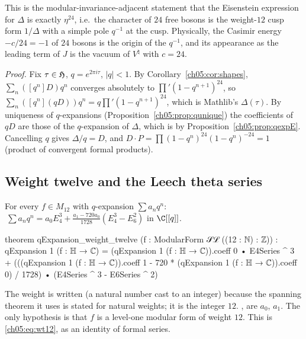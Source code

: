 \begin{physics}
This is the modular-invariance-adjacent statement that the Eisenstein expression for $\Delta$ is exactly $\eta^{24}$, i.e.\ the character of $24$ free bosons is the weight-$12$ cusp form $1/\Delta$ with a simple pole $q^{-1}$ at the cusp. Physically, the Casimir energy $-c/24=-1$ of $24$ bosons is the origin of the $q^{-1}$, and its appearance as the leading term of $J$ is the vacuum of $V^\natural$ with $c=24$.
\end{physics}
\noindent\emph{Proof.} Fix $\tau\in\mathfrak{H}$, $q = e^{2\pi i\tau}$, $|q|<1$. By
Corollary~\ref{ch05:cor:shapes}, $\sum_n([q^n]D)q^n$ converges absolutely to $\prod'(1-q^{n+1})^{24}$, so
$\sum_n([q^n](qD))q^n = q\prod'(1-q^{n+1})^{24}$, which is Mathlib's $\Delta(\tau)$. By uniqueness of
$q$-expansions (Proposition~\ref{ch05:prop:qunique}) the coefficients of $qD$ are those of the
$q$-expansion of $\Delta$, which is  by Proposition~\ref{ch05:prop:qexpE}. Cancelling $q$
gives $\Delta/q = D$, and $D\cdot P = \prod(1-q^n)^{24}(1-q^n)^{-24} = 1$ (product of convergent formal
products).

\subsection{Weight twelve and the Leech theta series}

\begin{theorem}\label{ch05:thm:wt12}
For every $f\in M_{12}$ with $q$-expansion $\sum a_nq^n$:
$\ \sum a_nq^n = a_0E_4^3 + \frac{a_1 - 720a_0}{1728}(E_4^3 - E_6^2)$ in $\C[[q]]$.
\end{theorem}
\begin{leancode}
theorem qExpansion_weight_twelve (f : ModularForm 𝒮ℒ ((12 : ℕ) : ℤ)) :
    qExpansion 1 (f : ℍ → ℂ)
      = (qExpansion 1 (f : ℍ → ℂ)).coeff 0 • E4Series ^ 3
        + (((qExpansion 1 (f : ℍ → ℂ)).coeff 1 - 720 * (qExpansion 1 (f : ℍ → ℂ)).coeff 0) / 1728)
          • (E4Series ^ 3 - E6Series ^ 2)
\end{leancode}
\begin{dictionary}
The weight is written  (a natural number cast to an integer) because the spanning
theorem it uses is stated for natural weights; it is the integer $12$. , 
are $a_0$, $a_1$. The only hypothesis is that $f$ is a level-one modular form of weight $12$. This is
\eqref{ch05:eq:wt12}, as an identity of formal series.
\end{dictionary}

